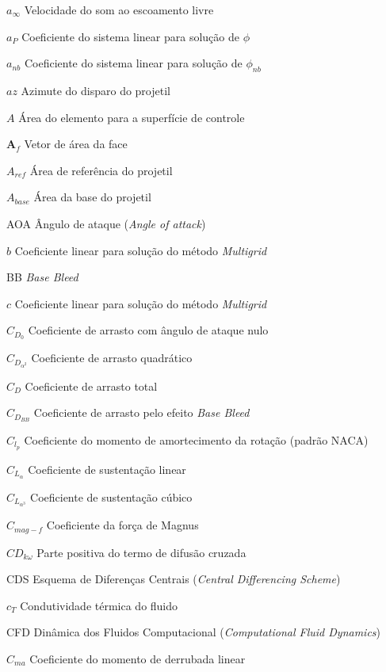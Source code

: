 \begin{siglas}
    \item[$a_\infty$] Velocidade do som ao escoamento livre
    \item[$a_P$] Coeficiente do sistema linear para solução de $\phi$
    \item[$a_{nb}$] Coeficiente do sistema linear para solução de $\phi_{nb}$
    \item[$az$] Azimute do disparo do projetil
    \item[$A$] Área do elemento para a superfície de controle
    \item[$\textbf{A}_{f}$] Vetor de área da face
    \item[$A_{ref}$] Área de referência do projetil
    \item[$A_{base}$] Área da base do projetil
    \item[AOA] Ângulo de ataque (\textit{Angle of attack})
    \item[$b$] Coeficiente linear para solução do método \textit{Multigrid}
    \item[BB] \textit{Base Bleed}
    \item[$c$] Coeficiente linear para solução do método \textit{Multigrid}
    \item[$C_{D_0}$] Coeficiente de arrasto com ângulo de ataque nulo
    \item[$C_{D_{\alpha^2}}$] Coeficiente de arrasto quadrático
    \item[$C_{D}$] Coeficiente de arrasto total
    \item[$C_{D_{BB}}$] Coeficiente de arrasto pelo efeito \textit{Base Bleed}
    \item[$C_{l_p}$] Coeficiente do momento de amortecimento da rotação (padrão NACA)
    \item[$C_{L_\alpha}$] Coeficiente de sustentação linear
    \item[$C_{L_{\alpha^3}}$] Coeficiente de sustentação cúbico
    \item[$C_{mag-f}$] Coeficiente da força de Magnus
    \item[$CD_{k\omega}$] Parte positiva do termo de difusão cruzada
    \item[CDS] Esquema de Diferenças Centrais (\textit{Central Differencing Scheme})
    \item[$c_T$] Condutividade térmica do fluido
    \item[CFD] Dinâmica dos Fluidos Computacional (\textit{Computational Fluid Dynamics})
    \item[$C_{ma}$] Coeficiente do momento de derrubada linear

\end{siglas}
